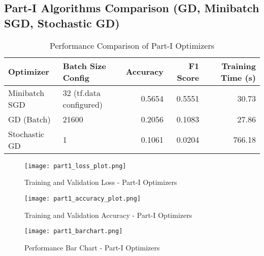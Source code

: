 \documentclass[11pt,a4paper]{article}
\begin{document}
\subsection{Part-I Algorithms Comparison (GD, Minibatch SGD, Stochastic GD)}
\begin{table}[H]
    \centering
    \caption{Performance Comparison of Part-I Optimizers}
    \label{tab:part1_summary}
    \begin{tabular}{@{}llrrr@{}}
        \toprule
        Optimizer     & Batch Size Config        & Accuracy & F1 Score & Training Time (s) \\ \midrule
        Minibatch SGD & 32 (tf.data configured)  & 0.5654   & 0.5551   & 30.73             \\
        GD (Batch)    & 21600                    & 0.2056   & 0.1083   & 27.86             \\
        Stochastic GD & 1                        & 0.1061   & 0.0204   & 766.18            \\ \bottomrule
    \end{tabular}
\end{table}

\begin{figure}[H]
    \centering
    \texttt{[image: part1\_loss\_plot.png]} %
    \caption{Training and Validation Loss - Part-I Optimizers}
    \label{fig:part1_loss}
\end{figure}
\begin{figure}[H]
    \centering
    \texttt{[image: part1\_accuracy\_plot.png]} %
    \caption{Training and Validation Accuracy - Part-I Optimizers}
    \label{fig:part1_accuracy}
\end{figure}
\begin{figure}[H]
    \centering
    \texttt{[image: part1\_barchart.png]} %
    \caption{Performance Bar Chart - Part-I Optimizers}
    \label{fig:part1_barchart}
\end{figure}
\clearpage %
\end{document}
